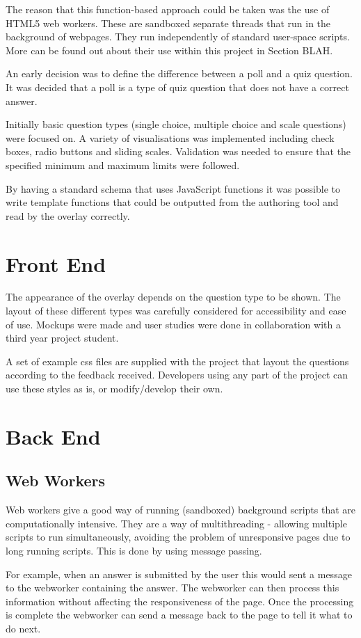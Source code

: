 The reason that this function-based approach could be taken was the use of HTML5 web workers. These are sandboxed separate threads that run in the background of webpages. They run independently of standard user-space scripts. More can be found out about their use within this project in Section BLAH. 

An early decision was to define the difference between a poll and a quiz question. It was decided that a poll is a type of quiz question that does not have a correct answer.

Initially basic question types (single choice, multiple choice and scale questions) were focused on. A variety of visualisations was implemented including check boxes, radio buttons and sliding scales. Validation was needed to ensure that the specified minimum and maximum limits were followed.

By having a standard schema that uses JavaScript functions it was possible to write template functions that could be outputted from the authoring tool and read by the overlay correctly.
\section{Front End} 
\label{Section:Front end}
The appearance of the overlay depends on the question type to be shown. The layout of these different types was carefully considered for accessibility and ease of use. Mockups were made and user studies were done in collaboration with a third year project student.

A set of example css files are supplied with the project that layout the questions according to the feedback received. Developers using any part of the project can use these styles as is, or modify/develop their own.
\section{Back End} 
\label{Section:Back end}
\subsection{Web Workers}
\label{Subsection:WebWorkers}
Web workers give a good way of running (sandboxed) background scripts that are computationally intensive. They are a way of multithreading - allowing multiple scripts to run simultaneously, avoiding the problem of unresponsive pages due to long running scripts. This is done by using message passing. 

For example, when an answer is submitted by the user this would sent a message to the webworker containing the answer. The webworker can then process this information without affecting the responsiveness of the page. Once the processing is complete the webworker can send a message back to the page to tell it what to do next.
